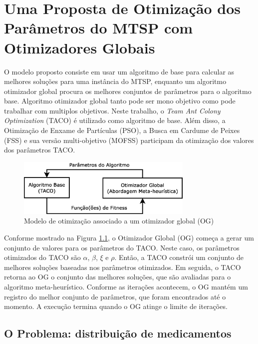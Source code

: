 \chapter{Uma Proposta de Otimização dos Parâmetros do MTSP com Otimizadores Globais}

O modelo proposto consiste em usar um algoritmo de base para calcular as melhores soluções para uma instância do MTSP, enquanto um algoritmo otimizador global procura os melhores conjuntos de parâmetros para o algoritmo base. Algoritmo otimizador global tanto pode ser mono objetivo como pode trabalhar com multiplos objetivos. Neste trabalho, o \textit{Team Ant Colony Optimization} (TACO) é utilizado como algoritmo de base. Além disso, a Otimização de Enxame de Partículas (PSO), a Busca em Cardume de Peixes (FSS) e sua versão multi-objetivo (MOFSS) participam da otimização dos valores dos parâmetros TACO.

\begin{figure}[htb]
    \centering
    \includegraphics[width=0.75\textwidth]{imagens/proposal-diag.eps}
    \caption{Modelo de otimização associado a um otimizador global (OG)} \label{fig:proposal-diag}
\end{figure}

Conforme mostrado na Figura \ref{fig:proposal-diag}, o Otimizador Global (OG) começa a gerar um conjunto de valores para os parâmetros do TACO. Neste caso, os parâmetros otimizados do TACO são $\alpha$, $\beta$, $\xi$ e $\rho$. Então, a TACO constrói um conjunto de melhores soluções baseadas nos parâmetros otimizados. Em seguida, o TACO retorna ao OG o conjunto das melhores soluções, que são avaliadas para o algoritmo meta-heurístico. Conforme as iterações acontecem, o OG mantém um registro do melhor conjunto de parâmetros, que foram encontrados até o momento. A execução termina quando o OG atinge o limite de iterações.

\section{O Problema: distribuição de medicamentos}
\label{sec-metodologia-problema}

